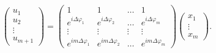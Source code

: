 \begin{equation}~\label{direction:u_system}
    \begin{pmatrix}
        u_1    \\
        u_2    \\
        \vdots \\
        u_{m+1}
    \end{pmatrix}
    =
    \begin{pmatrix}
        1                        & 1                        & \dots  & 1                        \\
        e^{i \Delta \varphi_1}   & e^{i \Delta \varphi_2}   & \dots  & e^{i \Delta \varphi_m}   \\
        \vdots                   & \vdots                   & \vdots & \vdots                   \\
        e^{i m \Delta \varphi_1} & e^{i m \Delta \varphi_2} & \dots  & e^{i m \Delta \varphi_m}
    \end{pmatrix}
    \begin{pmatrix}
        x_1    \\
        \vdots \\
        x_m
    \end{pmatrix} .
\end{equation}

